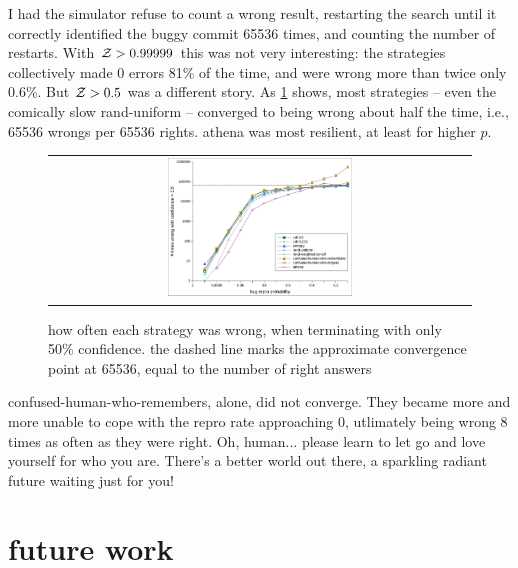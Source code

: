 \documentclass[11pt]{sigplanconf}
\begin{document}
I had the simulator refuse to count a wrong result, %
restarting the search until it correctly identified the buggy commit 65536 times,
and counting the number of restarts.
With $\mathcal{Z} > 0.99999$ this was not very interesting:
the strategies collectively made 0 errors 81\% of the time, and were wrong more than twice only 0.6\%.
But $\mathcal{Z} > 0.5$ was a different story.
As \cref{fig:wrongs} shows, most strategies
-- even the comically slow {\sf rand-uniform} --
converged to being wrong about half the time, i.e., 65536 wrongs per 65536 rights.
{\sf athena} was most resilient, at least for higher $p$.

\begin{figure}[t]
	\begin{tabular}{c}
		\includegraphics[width=0.45\textwidth]{wrongs.pdf}
	\end{tabular}
	\caption{how often each strategy was wrong, when terminating with only 50\% confidence.
	the dashed line marks the approximate convergence point at 65536, equal to the number of right answers}
	\label{fig:wrongs}
\end{figure}

{\sf confused-human-who-remembers}, alone, did not converge.
They became more and more unable to cope with the repro rate approaching 0,
utlimately being wrong 8 times as often as they were right.
Oh, human... please learn to let go and love yourself for who you are.
There's a better world out there, a sparkling radiant future waiting just for you!


\section{future work}
\end{document}
